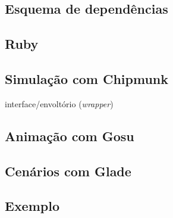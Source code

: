 \subsection{Esquema de dependências }
\subsection{Ruby}

\subsection{Simulação com Chipmunk}

interface/envoltório (\textit{wrapper})

\subsection{Animação com Gosu}
\subsection{Cenários com Glade}
\subsection{Exemplo}
